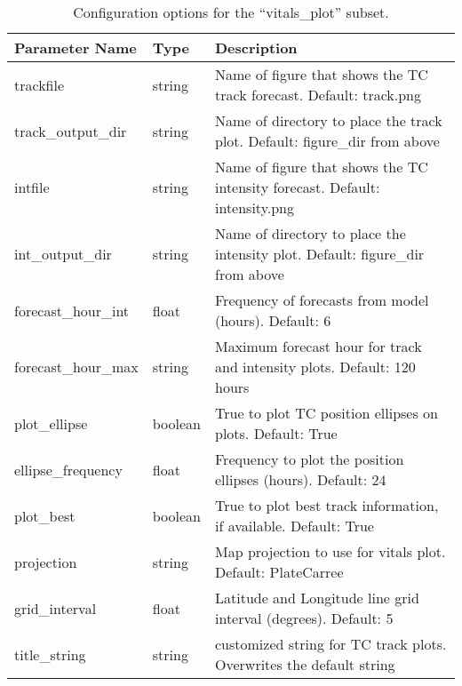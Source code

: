 \documentclass[psfig,12pt]{article}
\begin{document}
\begin{table}[H]  
\caption{Configuration options for the ``vitals\_plot'' subset.}
\begin{center}
\begin{tabular}{|p{1.60in}|p{0.5in}|p{4.15in}|}
\hline
Parameter Name & Type & Description \\ \hline \hline

trackfile & string & Name of figure that shows the TC track forecast.  Default:  track.png \\ \hline

track\_output\_dir & string & Name of directory to place the track plot.  Default: figure\_dir from above \\ \hline

intfile & string & Name of figure that shows the TC intensity forecast.  Default:  intensity.png \\ \hline

int\_output\_dir & string & Name of directory to place the intensity plot.  Default: figure\_dir from above \\ \hline

forecast\_hour\_int & float & Frequency of forecasts from model (hours).  Default: 6 \\ \hline

forecast\_hour\_max & string & Maximum forecast hour for track and intensity plots.  
Default:  120 hours \\ \hline

plot\_ellipse & boolean & True to plot TC position ellipses on plots.  Default:  True \\ \hline

ellipse\_frequency & float & Frequency to plot the position ellipses (hours).  Default: 24 \\ \hline

plot\_best & boolean & True to plot best track information, if available.  Default:  True \\ \hline

projection & string & Map projection to use for vitals plot.  Default:  PlateCarree \\ \hline

grid\_interval & float & Latitude and Longitude line grid interval (degrees).  Default:  5 \\ \hline

title\_string & string & customized string for TC track plots.  Overwrites the default string \\ \hline


\end{tabular}
\end{center}
\end{table}
\end{document}
